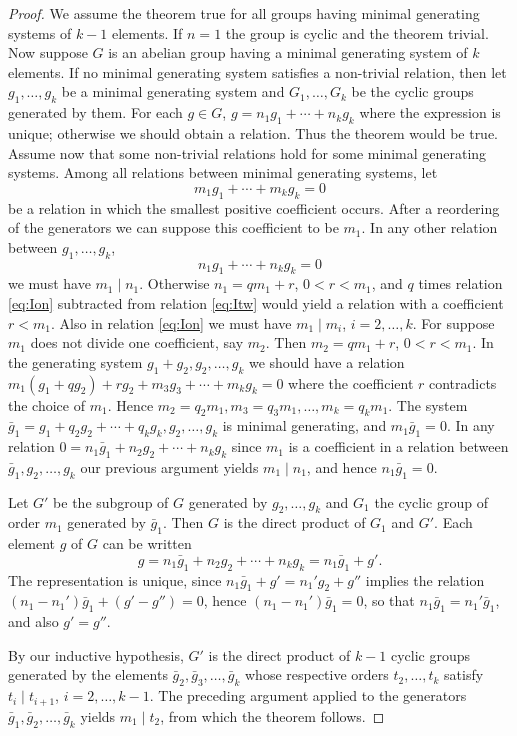 \documentclass[10pt,leqno,a5paper]{book}
\theoremstyle{definition}
\begin{document}
\begin{proof}
We assume the theorem true for all groups having minimal generating systems of $k-1$ elements.
If $n=1$ the group is cyclic and the theorem trivial.
Now suppose $G$ is an abelian group having a minimal generating system of $k$ elements.
If no minimal generating system satisfies a non-trivial relation, then let $g_1, \ldots, g_k$ be a minimal generating system and $G_1, \ldots, G_k$ be the cyclic groups generated by them.
For each $g \in G$, $g = n_1g_1 + \cdots + n_kg_k$ where the expression is unique; otherwise we should obtain a relation.
Thus the theorem would be true.
Assume now that some non-trivial relations hold for some minimal generating systems.
Among all relations between minimal generating systems, let
\begin{equation}
\label{eq:Ion}
m_1 g_1 + \cdots + m_k g_k = 0
\end{equation}
be a relation in which the smallest positive coefficient occurs.
After a reordering of the generators we can suppose this coefficient to be $m_1$.
In any other relation between $g_1, \ldots, g_k$,
\begin{equation}
\label{eq:Itw}
n_1g_1 + \cdots + n_kg_k = 0
\end{equation}
we must have $m_1 \mid n_1$.
Otherwise $n_1 = q m_1 + r$, $0 < r < m_1$, and $q$ times relation \eqref{eq:Ion} subtracted from relation \eqref{eq:Itw} would yield a relation with a coefficient $r < m_1$.
Also in relation \eqref{eq:Ion} we must have $m_1 \mid m_i$, $i = 2, \ldots, k$.
For suppose $m_1$ does not divide one coefficient, say $m_2$.
Then $m_2 = q m_1 + r$, $0 < r < m_1$.
In the generating system $g_1+g_2, g_2,\ldots,g_k$ we should have a relation $m_1(g_1 + qg_2) + rg_2 + m_3g_3 + \cdots + m_k g_k = 0$ where the coefficient $r$ contradicts the choice of $m_1$.
Hence $m_2 = q_2 m_1, m_3 = q_3 m_1, \ldots, m_k = q_k m_1$.
The system $\bar g_1 = g_1 + q_2g_2 + \cdots + q_k g_k, g_2, \ldots, g_k$ is minimal generating, and $m_1 \bar g_1 = 0$.
In any relation $0 = n_1 \bar g_1 + n_2 g_2 + \cdots + n_k g_k$ since $m_1$ is a coefficient in a relation between $\bar g_1, g_2, \ldots, g_k$ our previous argument yields $m_1 \mid n_1$, and hence $n_1 \bar g_1 = 0$.

Let $G'$ be the subgroup of $G$ generated by $g_2, \ldots, g_k$ and $G_1$ the cyclic group of order $m_1$ generated by $\bar g_1$.
Then $G$ is the direct product of $G_1$ and $G'$.
Each element $g$ of $G$ can be written
\[
g = n_1 \bar g_1 + n_2 g_2 + \cdots + n_k g_k
= n_1 \bar g_1 + g'.
\]
The representation is unique, since $n_1 \bar g_1 + g' = n_1' g_2 + g''$ implies the relation $(n_1 - n_1') \bar g_1 + (g' - g'') = 0$, hence $(n_1 - n_1') \bar g_1 = 0$, so that $n_1 \bar g_1 = n_1' \bar g_1$, and also $g' = g''$.

By our inductive hypothesis, $G'$ is the direct product of $k-1$ cyclic groups generated by the elements $\bar g_2, \bar g_3, \ldots, \bar g_k$ whose respective orders $t_2, \ldots, t_k$ satisfy $t_i \mid t_{i+1}$, $i = 2,\ldots,k-1$.
The preceding argument applied to the generators $\bar g_1, \bar g_2, \ldots, \bar g_k$ yields $m_1 \mid t_2$, from which the theorem follows.
\end{proof}
\end{document}
